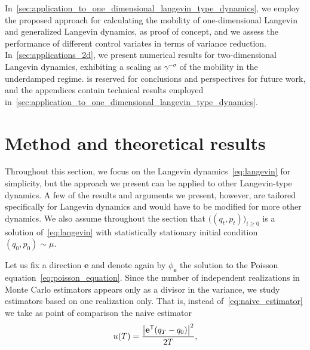 \documentclass[11pt,a4paper]{article}
\newcommand{\vect}[1]{\boldsymbol{\mathbf #1}}
\renewcommand{\t}{\mathsf T}
\theoremstyle{plain}
\numberwithin{equation}{section}
\renewcommand{\geq}{\geqslant}
\begin{document}
In~\cref{sec:application_to_one_dimensional_langevin_type_dynamics},
we employ the proposed approach for calculating the mobility of one-dimensional Langevin and generalized Langevin dynamics,
as proof of concept,
and we assess the performance of different control variates in terms of variance reduction.
In~\cref{sec:applications_2d},
we present numerical results for two-dimensional Langevin dynamics,
exhibiting a scaling as $\gamma^{-\sigma}$ of the mobility in the underdamped regime.
 is reserved for conclusions and perspectives for future work,
and the appendices contain technical results employed in~\cref{sec:application_to_one_dimensional_langevin_type_dynamics}.



\section{Method and theoretical results}%
\label{sec:method}%

Throughout this section,
we focus on the Langevin dynamics~\eqref{eq:langevin} for simplicity,
but the approach we present can be applied to other Langevin-type dynamics.
A few of the results and arguments we present, however,
are tailored specifically for Langevin dynamics and would have to be modified for more other dynamics.
We also assume throughout the section that $\bigl((q_t, p_t)\bigr)_{t\geq 0}$ is a solution of~\eqref{eq:langevin} with statistically stationary initial condition~$(q_0, p_0) \sim \mu$.

Let us fix a direction $\vect e$ and denote again by $\phi_{\vect e}$ the solution to the Poisson equation~\eqref{eq:poisson_equation}.
Since the number of independent realizations in Monte Carlo estimators
appears only as a divisor in the variance,
we study estimators based on one realization only.
That is, instead of~\eqref{eq:naive_estimator} we take as point of comparison the naive estimator
\begin{equation}
    \label{eq:simple_estimator}
    u(T) = \frac{\abs{\vect e^\t (q_T - q_0)}^2}{2T},
\end{equation}
\end{document}
